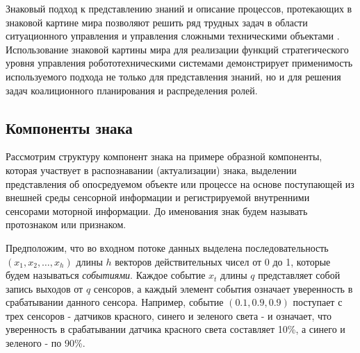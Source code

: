 \documentclass[12pt]{scrartcl}
\begin{document}
	Знаковый подход к представлению знаний и описание процессов, протекающих в знаковой картине мира позволяют решить ряд трудных задач в области ситуационного управления \cite{Osipov1999,Osipov2002c} и управления сложными техническими объектами \cite{Zubarev2013}. Использование знаковой картины мира для реализации функций стратегического уровня управления робототехническими системами \cite{Makarov2015a} демонстрирует применимость используемого подхода не только для представления знаний, но и для решения задач коалиционного планирования и распределения ролей.
	
	\subsection{Компоненты знака}\label{subsec:components}
	
	Рассмотрим структуру компонент знака на примере образной компоненты, которая участвует в распознавании (актуализации) знака, выделении представления об опосредуемом объекте или процессе на основе поступающей из внешней среды сенсорной информации и регистрируемой внутренними сенсорами моторной информации. До именования знак будем называть протознаком или признаком.
	
	Предположим, что во входном потоке данных выделена последовательность $(x_1,x_2,\dots,x_h)$ длины $h$ векторов действительных чисел от 0 до 1, которые будем называться \textit{событиями}. Каждое событие $x_t$ длины $q$ представляет собой запись выходов от $q$ сенсоров, а каждый элемент события означает уверенность в срабатывании данного сенсора. Например, событие $(0.1, 0.9, 0.9)$ поступает с трех сенсоров - датчиков красного, синего и зеленого света - и означает, что уверенность в срабатывании датчика красного света составляет 10\%, а синего и зеленого - по 90\%.
	
\end{document}
